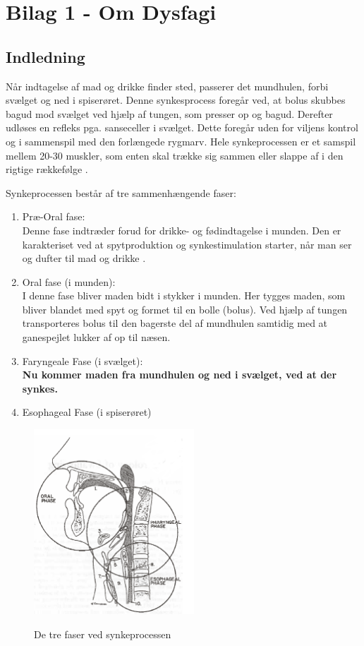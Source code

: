 \documentclass[main.tex]{subfiles}
\begin{document}
\chapter*{Bilag 1 - Om Dysfagi}
\label{Bilag1}
\section*{Indledning}
Når indtagelse af mad og drikke finder sted, passerer det mundhulen, forbi svælget og ned i spiserøret. Denne synkesprocess foregår ved, at bolus skubbes bagud mod svælget ved hjælp af tungen, som presser op og bagud. Derefter udløses en refleks pga. sanseceller i svælget. Dette foregår uden for viljens kontrol og i sammenspil med den forlængede rygmarv. Hele synkeprocessen er et samspil mellem 20-30 muskler, som enten skal trække sig sammen eller slappe af i den rigtige rækkefølge \cite{Sand2008MennesketsFysiologi}. 

Synkeprocessen består af tre sammenhængende faser:
\begin{enumerate}
\item Præ-Oral fase:\\
Denne fase indtræder forud for drikke- og fødindtagelse i munden. Den er karakteriset ved at spytproduktion og synkestimulation starter, når man ser og dufter til mad og drikke \cite [s. 12]{Kjaersgaard2013DifficultiesPerspective}.    
\item Oral fase (i munden): \\
I denne fase bliver maden bidt i stykker i munden. Her tygges maden, som bliver blandet med spyt og formet til en bolle (bolus). Ved hjælp af tungen transporteres bolus til den bagerste del af mundhulen samtidig med at ganespejlet lukker af op til næsen.
\item Faryngeale Fase (i svælget): \\
\textbf{Nu kommer maden fra mundhulen og ned i svælget, ved at der synkes.} 
\item Esophageal Fase (i spiserøret)\cite{Bass1992Dysphagia:Management}
\end{enumerate}

\begin{figure}[H]
\centering
{\includegraphics[width=6cm]
{Figure/dysfagi3faser}}
\caption{De tre faser ved synkeprocessen\cite{Bass1992Dysphagia:Management}}
\label{trefaser}
\end{figure}
\end{document}
